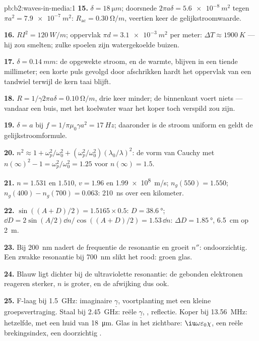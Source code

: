 \begin{solution}{pb:b2:waves-in-media:1}
\textbf{15.} $\delta = \qty{18}{\micro m}$; doorsnede
$2\pi a\delta = \qty{5.6e-8}{m^2}$ tegen $\pi a^2 = \qty{7.9e-7}{m^2}$:
$R_{\text{ac}} = \qty{0.30}{\ohm/m}$, veertien keer de gelijkstroomwaarde.

\textbf{16.} $RI^2 = \qty{120}{W/m}$; oppervlak $\pi d = \qty{3.1e-3}{m^2}$
per meter: $\Delta T \approx \qty{1900}{K}$ --- hij zou smelten; zulke
spoelen zijn watergekoelde buizen.

\textbf{17.} $\delta = \qty{0.14}{mm}$: de opgewekte stroom, en de warmte,
blijven in een tiende millimeter; een korte puls gevolgd door afschrikken
hardt het oppervlak van een tandwiel terwijl de kern taai blijft.

\textbf{18.} $R = 1/\gamma2\pi a\delta = \qty{0.10}{\ohm/m}$, drie keer
minder; de binnenkant voert niets --- vandaar een buis, met het koelwater
waar het koper toch verspild zou zijn.

\textbf{19.} $\delta = a$ bij $f = 1/\pi\mu_0\gamma a^2 = \qty{17}{Hz}$;
daaronder is de stroom uniform en geldt de gelijkstroomformule.

\textbf{20.}
$n^2 \approx 1 + \omega_p^2/\omega_0^2 + (\omega_p^2/\omega_0^2)(\lambda_0/\lambda)^2$:
de vorm van Cauchy met $n(\infty)^2 - 1 = \omega_p^2/\omega_0^2 = 1.25$ voor
$n(\infty) = 1.5$.

\textbf{21.} $n = 1.531$ en $1.510$, $v = 1.96$ en \qty{1.99e8}{m/s};
$n_g(550) =
1.550$; $n_g(400) - n_g(700) = 0.063$: \qty{210}{ns} over een
kilometer.

\textbf{22.} $\sin((A + D)/2) = 1.5165 \times 0.5$:
$D = \qty{38.6}{\degree}$;
$\dd D = 2\sin
(A/2)\dd n/\cos((A + D)/2) = 1.53\,\dd n$:
$\Delta D = \qty{1.85}{\degree}$, \qty{6.5}{cm} op \qty{2}{m}.

\textbf{23.} Bij \qty{200}{nm} nadert de frequentie de resonantie en groeit
$n''$: ondoorzichtig. Een zwakke resonantie bij \qty{700}{nm} slikt het
rood: groen glas.

\textbf{24.} Blauw ligt dichter bij de ultraviolette resonantie: de gebonden
elektronen reageren sterker, $n$ is groter, en de afwijking dus ook.

\textbf{25.} F-laag bij \qty{1.5}{GHz}: imaginaire $\underline\gamma$,
voortplanting met een kleine groepsvertraging. Staal bij \qty{2.45}{GHz}:
reële $\underline\gamma$, , reflectie. Koper bij \qty{13.56}{MHz}:
hetzelfde, met een huid van \qty{18}{\micro m}. Glas in het zichtbare:
$\iu\omega\varepsilon_0\chi$, een reële brekingsindex, een doorzichtig
.
\end{solution}
